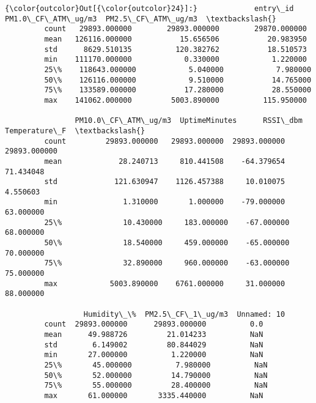\documentclass[11pt]{article}
\begin{document}
\begin{Verbatim}[commandchars=\\\{\}]
{\color{outcolor}Out[{\color{outcolor}24}]:}             entry\_id  PM1.0\_CF\_ATM\_ug/m3  PM2.5\_CF\_ATM\_ug/m3  \textbackslash{}
         count   29893.000000        29893.000000        29870.000000   
         mean   126116.000000           15.656506           20.983950   
         std      8629.510135          120.382762           18.510573   
         min    111170.000000            0.330000            1.220000   
         25\%    118643.000000            5.040000            7.980000   
         50\%    126116.000000            9.510000           14.765000   
         75\%    133589.000000           17.280000           28.550000   
         max    141062.000000         5003.890000          115.950000   
         
                PM10.0\_CF\_ATM\_ug/m3  UptimeMinutes      RSSI\_dbm  Temperature\_F  \textbackslash{}
         count         29893.000000   29893.000000  29893.000000   29893.000000   
         mean             28.240713     810.441508    -64.379654      71.434048   
         std             121.630947    1126.457388     10.010075       4.550603   
         min               1.310000       1.000000    -79.000000      63.000000   
         25\%              10.430000     183.000000    -67.000000      68.000000   
         50\%              18.540000     459.000000    -65.000000      70.000000   
         75\%              32.890000     960.000000    -63.000000      75.000000   
         max            5003.890000    6761.000000     31.000000      88.000000   
         
                  Humidity\_\%  PM2.5\_CF\_1\_ug/m3  Unnamed: 10  
         count  29893.000000      29893.000000          0.0  
         mean      49.988726         21.014233          NaN  
         std        6.149002         80.844029          NaN  
         min       27.000000          1.220000          NaN  
         25\%       45.000000          7.980000          NaN  
         50\%       52.000000         14.790000          NaN  
         75\%       55.000000         28.400000          NaN  
         max       61.000000       3335.440000          NaN  
\end{Verbatim}
            

    
    
    
    
\end{document}
